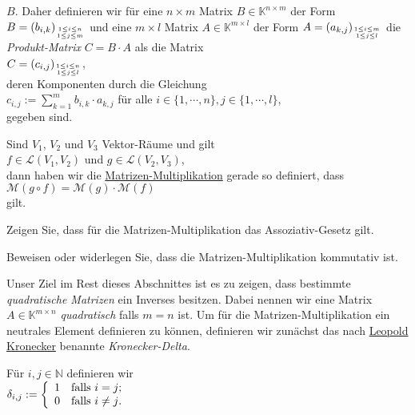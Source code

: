 $B$.  Daher definieren wir f\"{u}r eine 
$n \times m$ Matrix $B \in \mathbb{K}^{n \times m}$ der Form $B = (b_{i,k})_{1\leq i \leq n \atop 1 \leq j \leq m}$ und eine $m \times l$ Matrix
$A \in \mathbb{K}^{m \times l}$ der Form $A = (a_{k,j})_{1\leq i \leq m \atop 1 \leq j \leq l}$ die
\emph{\color{blue}Produkt-Matrix} $C= B \cdot A$ als die
Matrix
\\[0.2cm]
\hspace*{1.3cm}
$C = (c_{i,j})_{1\leq i \leq n \atop 1 \leq j \leq l}$, 
\\[0.2cm]
deren Komponenten durch die Gleichung
\\[0.2cm]
\hspace*{1.3cm}
$c_{i,j} := \sum\limits_{k=1}^m b_{i,k} \cdot a_{k,j}$ \quad f\"{u}r alle $i \in \{1,\cdots,n\}, j \in\{1,\cdots,l\}$,
\\[0.2cm]
gegeben sind.

\remark
Sind $V_1$, $V_2$ und $V_3$ Vektor-R\"{a}ume und gilt
\\[0.2cm]
\hspace*{1.3cm}
 $f \in \mathcal{L}(V_1, V_2)$ und $g \in \mathcal{L}(V_2, V_3)$,
\\[0.2cm]
dann haben wir die 
\href{http://de.wikipedia.org/wiki/Matrizenmultiplikation}{Matrizen-Multiplikation} gerade so definiert, dass
\\[0.2cm]
\hspace*{1.3cm}
$\mathcal{M}(g \circ f) = \mathcal{M}(g) \cdot \mathcal{M}(f)$
\\[0.2cm]
gilt.  \eoxs

\exerciseStar
Zeigen Sie, dass f\"{u}r die Matrizen-Multiplikation das Assoziativ-Gesetz gilt.
\eoxs

\exercise
Beweisen oder widerlegen Sie, dass die Matrizen-Multiplikation kommutativ ist.
\eox

Unser Ziel im Rest dieses Abschnittes ist es zu zeigen, dass bestimmte \emph{quadratische Matrizen} ein
Inverses besitzen.  Dabei nennen wir eine Matrix $A \in \mathbb{K}^{m \times n}$ {\emph{\color{blue}quadratisch}}
falls $m = n$ ist.  Um f\"{u}r die Matrizen-Multiplikation ein neutrales Element definieren zu k\"{o}nnen,
definieren wir zun\"{a}chst das nach 
\href{http://de.wikipedia.org/wiki/Leopold_Kronecker}{Leopold Kronecker} benannte \emph{\color{blue}Kronecker-Delta}.


\begin{Definition}
  F\"{u}r $i,j \in \mathbb{N}$ definieren wir
  \\[0.2cm]
  \hspace*{1.3cm}
  $\delta_{i,j} := \left\{
                  \begin{array}[c]{ll}
                    1 & \mbox{falls $i = j$;} \\
                    0 & \mbox{falls $i \not= j$}.
                  \end{array}
                  \right.
  $
\eoxs
\end{Definition}

